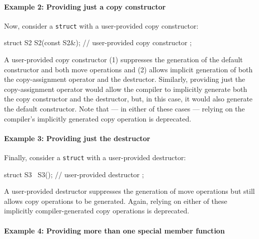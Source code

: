 \paragraph[Example 2: Providing just a copy constructor]{Example 2: Providing just a copy constructor}\label{example-2:-providing-just-a-copy-constructor}

Now, consider a \lstinline!struct! with a user-provided copy constructor:

\begin{emcppslisting}
struct S2
{
    S2(const S2&);  // user-provided copy constructor
};
\end{emcppslisting}

\noindent A user-provided copy constructor (1) suppresses the generation of the
default constructor and both move operations and (2) allows implicit
generation of both the copy-assignment operator and the destructor.
Similarly, providing just the copy-assignment operator would allow the
compiler to implicitly generate both the copy constructor and the
destructor, but, in this case, it would also generate the default
constructor. Note that --- in either of these
cases --- relying on the compiler's implicitly generated copy operation
is deprecated.

\paragraph[Example 3: Providing just the destructor]{Example 3: Providing just the destructor}\label{example-3:-providing-just-the-destructor}

Finally, consider a \lstinline!struct! with a user-provided destructor:


\begin{emcppslisting}
struct S3
{
    ~S3();  // user-provided destructor
};
\end{emcppslisting}

\noindent A user-provided destructor suppresses the generation of move
operations but still allows copy operations to be generated. Again,
relying on either of these implicitly compiler-generated copy
operations is deprecated.

\paragraph[Example 4: Providing more than one special member function]{Example 4: Providing more than one special member function}\label{example-4:-providing-more-than-one-special-member}

